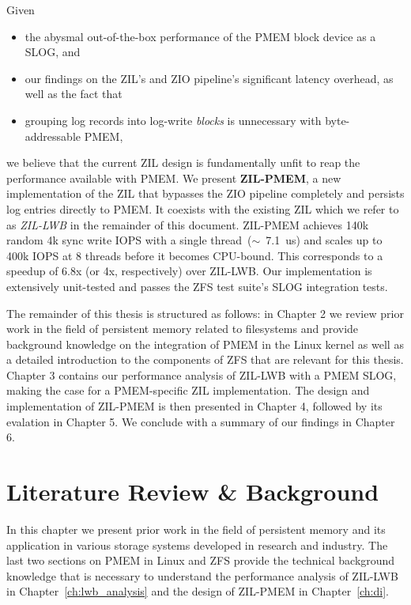 \documentclass[12pt,a4paper,twoside]{book}
\begin{document}
Given
\begin{itemize}[noitemsep]
    \item the abysmal out-of-the-box performance of the PMEM block device as a SLOG, and
    \item our findings on the ZIL's and ZIO pipeline's significant latency overhead, as well as the fact that
    \item grouping log records into log-write \textit{blocks} is unnecessary with byte-addressable PMEM,
\end{itemize}
we believe that the current ZIL design is fundamentally unfit to reap the performance available with PMEM.
We present \textbf{ZIL-PMEM}, a new implementation of the ZIL that bypasses the ZIO pipeline completely and persists log entries directly to PMEM.
It coexists with the existing ZIL which we refer to as \textit{ZIL-LWB} in the remainder of this document.
ZIL-PMEM achieves 140k random 4k sync write IOPS with a single thread~($\sim$~\SI{7.1}{us}) and scales up to 400k IOPS at 8 threads before it becomes CPU-bound.
This corresponds to a speedup of 6.8x (or 4x, respectively) over ZIL-LWB.
Our implementation is extensively unit-tested and passes the ZFS test suite's SLOG integration tests.

The remainder of this thesis is structured as follows:
in Chapter 2 we
review prior work in the field of persistent memory related to filesystems and
provide background knowledge on the integration of PMEM in the Linux kernel as well as
a detailed introduction to the components of ZFS that are relevant for this thesis.
Chapter 3 contains our performance analysis of ZIL-LWB with a PMEM SLOG, making the case for a PMEM-specific ZIL implementation.
The design and implementation of ZIL-PMEM is then presented in Chapter 4, followed by its evalation in Chapter 5.
We conclude with a summary of our findings in Chapter 6.


\chapter{Literature Review \& Background}
In this chapter we present prior work in the field of persistent memory and its application in various storage systems developed in research and industry.
The last two sections on PMEM in Linux and ZFS provide the technical background knowledge that is necessary to understand the performance analysis of ZIL-LWB in Chapter~\ref{ch:lwb_analysis} and the design of ZIL-PMEM in Chapter~\ref{ch:di}.
\end{document}

